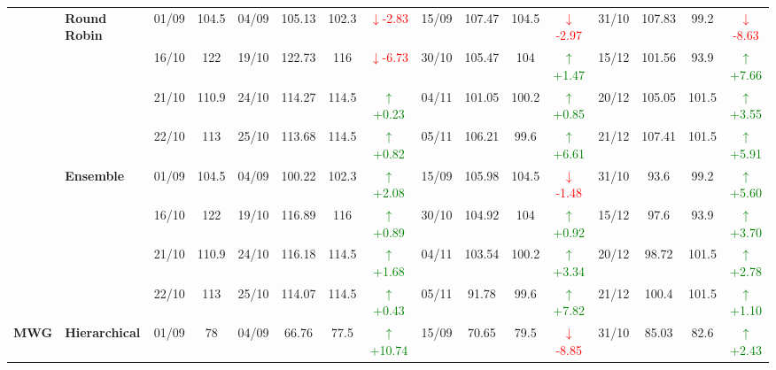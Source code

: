 {\begin{longtable}{llcc|cccc|cccc|cccc}
& \textbf{Round Robin}
& 01/09 & 104.5 & 04/09 & 105.13 & 102.3 & \textcolor{red}{\(\downarrow\)-2.83} & 15/09 & 107.47 & 104.5 & \textcolor{red}{\(\downarrow\)-2.97} & 31/10 & 107.83 & 99.2 & \textcolor{red}{\(\downarrow\)-8.63} \\

&
& 16/10 & 122 & 19/10 & 122.73 & 116 & \textcolor{red}{\(\downarrow\)-6.73} & 30/10 & 105.47 & 104 & \textcolor{green}{\(\uparrow\)+1.47} & 15/12 & 101.56 & 93.9 & \textcolor{green}{\(\uparrow\)+7.66} \\

&
& 21/10 & 110.9 & 24/10 & 114.27 & 114.5 & \textcolor{green}{\(\uparrow\)+0.23} & 04/11 & 101.05 & 100.2 & \textcolor{green}{\(\uparrow\)+0.85} & 20/12 & 105.05 & 101.5 & \textcolor{green}{\(\uparrow\)+3.55} \\

&
& 22/10 & 113 & 25/10 & 113.68 & 114.5 & \textcolor{green}{\(\uparrow\)+0.82} & 05/11 & 106.21 & 99.6 & \textcolor{green}{\(\uparrow\)+6.61} & 21/12 & 107.41 & 101.5 & \textcolor{green}{\(\uparrow\)+5.91} \\
\cmidrule(lr){2-16}


& \textbf{Ensemble}
& 01/09 & 104.5 & 04/09 & 100.22 & 102.3 & \textcolor{green}{\(\uparrow\)+2.08} & 15/09 & 105.98 & 104.5 & \textcolor{red}{\(\downarrow\)-1.48} & 31/10 & 93.6 & 99.2 & \textcolor{green}{\(\uparrow\)+5.60} \\

&
& 16/10 & 122 & 19/10 & 116.89 & 116 & \textcolor{green}{\(\uparrow\)+0.89} & 30/10 & 104.92 & 104 & \textcolor{green}{\(\uparrow\)+0.92} & 15/12 & 97.6 & 93.9 & \textcolor{green}{\(\uparrow\)+3.70} \\

&
& 21/10 & 110.9 & 24/10 & 116.18 & 114.5 & \textcolor{green}{\(\uparrow\)+1.68} & 04/11 & 103.54 & 100.2 & \textcolor{green}{\(\uparrow\)+3.34} & 20/12 & 98.72 & 101.5 & \textcolor{green}{\(\uparrow\)+2.78} \\

&
& 22/10 & 113 & 25/10 & 114.07 & 114.5 & \textcolor{green}{\(\uparrow\)+0.43} & 05/11 & 91.78 & 99.6 & \textcolor{green}{\(\uparrow\)+7.82} & 21/12 & 100.4 & 101.5 & \textcolor{green}{\(\uparrow\)+1.10} \\
\midrule




\multirow{12}{*}{\textbf{MWG}} 
& \textbf{Hierarchical}
& 01/09 & 78 & 04/09 & 66.76 & 77.5 & \textcolor{green}{\(\uparrow\)+10.74} & 15/09 & 70.65 & 79.5 & \textcolor{red}{\(\downarrow\)-8.85} & 31/10 & 85.03 & 82.6 & \textcolor{green}{\(\uparrow\)+2.43} \\


\end{longtable}}
